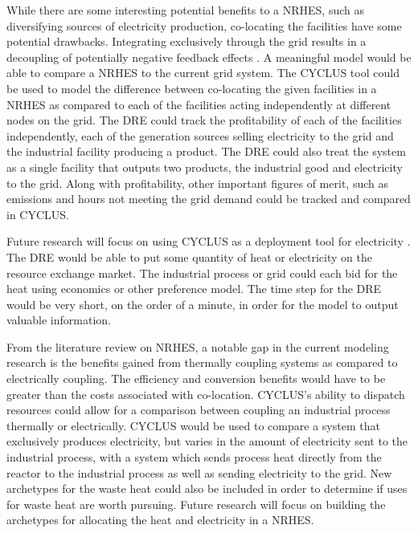 \documentclass{article}                                                                           %
\begin{document}
\begin{linenumbers}
While there are some interesting potential benefits to a NRHES, such as diversifying sources of electricity production, co-locating the facilities have some potential drawbacks.  Integrating exclusively through the grid results in a decoupling of potentially negative feedback effects \cite{Harrison2016}.  A meaningful model would be able to compare a NRHES to the current grid system. The CYCLUS tool could be used to model the difference between co-locating the given facilities in a NRHES as compared to each of the facilities acting independently at different nodes on the grid.  The DRE could track the profitability of each of the facilities independently, each of the generation sources selling electricity to the grid and the industrial facility producing a product.  The DRE could also treat the system as a single facility that outputs two products, the industrial good and electricity to the grid. Along with profitability, other important figures of merit, such as emissions and hours not meeting the grid demand could be tracked and compared in CYCLUS.

Future research will focus on using CYCLUS as a deployment tool for electricity \cite{redfoot_rabiti_2017}. The DRE would be able to put some quantity of heat or electricity on the resource exchange market.  The industrial process or grid could each bid for the heat using economics or other preference model.  The time step for the DRE would be very short, on the order of a minute, in order for the model to output valuable information.

From the literature review on NRHES, a notable gap in the current modeling research is the benefits gained from thermally coupling systems as compared to electrically coupling.  The efficiency and conversion benefits would have to be greater than the costs associated with co-location.  CYCLUS's ability to dispatch resources could allow for a comparison between coupling an industrial process thermally or electrically. CYCLUS would be used to compare a system that exclusively produces electricity, but varies in the amount of electricity sent to the industrial process, with a system which sends process heat directly from the reactor to the industrial process as well as sending electricity to the grid.   New archetypes for the waste heat could also be included in order to determine if uses for waste heat are worth pursuing.  Future research will focus on building the archetypes for allocating the heat and electricity in a NRHES.


\end{linenumbers}
\end{document}
